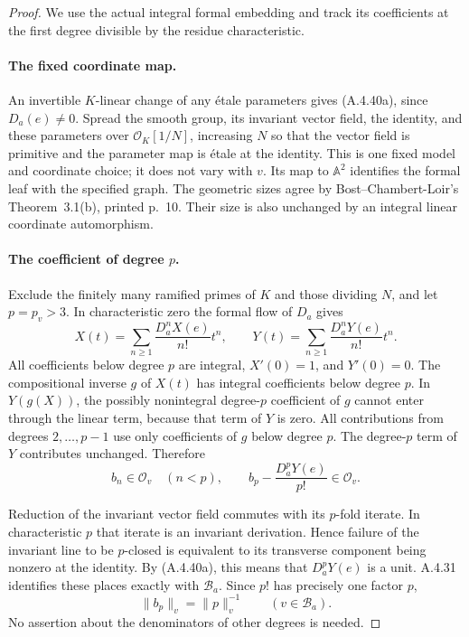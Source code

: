 \begin{proof}
We use the actual integral formal embedding and track its coefficients
at the first degree divisible by the residue characteristic.

\paragraph{The fixed coordinate map.}
An invertible $K$-linear change of any \'etale parameters gives
(A.4.40a), since $D_a(e)\ne0$.  Spread the smooth group, its invariant
vector field, the identity, and these parameters over
$\mathcal O_K[1/N]$, increasing $N$ so that the vector field is
primitive and the parameter map is \'etale at the identity.
This is one fixed model and coordinate choice; it does not vary with
$v$.  Its map to $\mathbb A^2$ identifies the formal leaf with the
specified graph.  The geometric sizes agree by
Bost--Chambert-Loir's Theorem~3.1(b), printed p.~10.
Their size is also unchanged by an integral linear coordinate
automorphism.\cite{AuditBostChambertLoir2008v3}

\paragraph{The coefficient of degree $p$.}
Exclude the finitely many ramified primes of $K$ and those dividing
$N$, and let $p=p_v>3$.  In characteristic zero the formal flow of
$D_a$ gives
\[
 X(t)=\sum_{n\ge1}\frac{D_a^nX(e)}{n!}t^n,
 \qquad
 Y(t)=\sum_{n\ge1}\frac{D_a^nY(e)}{n!}t^n.
 \tag{A.4.40d}
\]
All coefficients below degree $p$ are integral, $X'(0)=1$, and
$Y'(0)=0$.  The compositional inverse $g$ of $X(t)$ has integral
coefficients below degree $p$.  In $Y(g(X))$, the possibly
nonintegral degree-$p$ coefficient of $g$ cannot enter through the
linear term, because that term of $Y$ is zero.  All contributions
from degrees $2,\ldots,p-1$ use only coefficients of $g$ below
degree $p$.  The degree-$p$ term of $Y$ contributes unchanged.
Therefore
\[
 b_n\in\mathcal O_v\quad(n<p),\qquad
 b_p-\frac{D_a^pY(e)}{p!}\in\mathcal O_v.
 \tag{A.4.40e}
\]

Reduction of the invariant vector field commutes with its $p$-fold
iterate.  In characteristic $p$ that iterate is an invariant
derivation.  Hence failure of the invariant line to be $p$-closed is
equivalent to its transverse component being nonzero at the
identity.  By (A.4.40a), this means that $D_a^pY(e)$ is a unit.
A.4.31 identifies these places exactly with $\mathcal B_a$.
Since $p!$ has precisely one factor $p$,
\[
                  \|b_p\|_v=\|p\|_v^{-1}
                         \qquad(v\in\mathcal B_a).
 \tag{A.4.40f}
\]
No assertion about the denominators of other degrees is needed.


\end{proof}
